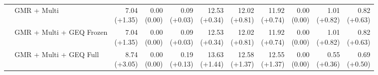 \documentclass{article}
\begin{document}
{\begin{tabular}{llrrrrrrrrr}
 & GMR + Multi & \shortstack{7.04 \\ {\scriptsize\textcolor{Gain}{(+1.35)}}} & \shortstack{0.00 \\ {\scriptsize\textcolor{Zero}{(0.00)}}} & \shortstack{0.09 \\ {\scriptsize\textcolor{Gain}{(+0.03)}}} & \shortstack{12.53 \\ {\scriptsize\textcolor{Gain}{(+0.34)}}} & \shortstack{12.02 \\ {\scriptsize\textcolor{Gain}{(+0.81)}}} & \shortstack{11.92 \\ {\scriptsize\textcolor{Gain}{(+0.74)}}} & \shortstack{0.00 \\ {\scriptsize\textcolor{Zero}{(0.00)}}} & \shortstack{1.01 \\ {\scriptsize\textcolor{Gain}{(+0.82)}}} & \shortstack{0.82 \\ {\scriptsize\textcolor{Gain}{(+0.63)}}} \\
 & GMR + Multi + GEQ Frozen & \shortstack{7.04 \\ {\scriptsize\textcolor{Gain}{(+1.35)}}} & \shortstack{0.00 \\ {\scriptsize\textcolor{Zero}{(0.00)}}} & \shortstack{0.09 \\ {\scriptsize\textcolor{Gain}{(+0.03)}}} & \shortstack{12.53 \\ {\scriptsize\textcolor{Gain}{(+0.34)}}} & \shortstack{12.02 \\ {\scriptsize\textcolor{Gain}{(+0.81)}}} & \shortstack{11.92 \\ {\scriptsize\textcolor{Gain}{(+0.74)}}} & \shortstack{0.00 \\ {\scriptsize\textcolor{Zero}{(0.00)}}} & \shortstack{1.01 \\ {\scriptsize\textcolor{Gain}{(+0.82)}}} & \shortstack{0.82 \\ {\scriptsize\textcolor{Gain}{(+0.63)}}} \\
 & GMR + Multi + GEQ Full & \shortstack{8.74 \\ {\scriptsize\textcolor{Gain}{(+3.05)}}} & \shortstack{0.00 \\ {\scriptsize\textcolor{Zero}{(0.00)}}} & \shortstack{0.19 \\ {\scriptsize\textcolor{Gain}{(+0.13)}}} & \shortstack{13.63 \\ {\scriptsize\textcolor{Gain}{(+1.44)}}} & \shortstack{12.58 \\ {\scriptsize\textcolor{Gain}{(+1.37)}}} & \shortstack{12.55 \\ {\scriptsize\textcolor{Gain}{(+1.37)}}} & \shortstack{0.00 \\ {\scriptsize\textcolor{Zero}{(0.00)}}} & \shortstack{0.55 \\ {\scriptsize\textcolor{Gain}{(+0.36)}}} & \shortstack{0.69 \\ {\scriptsize\textcolor{Gain}{(+0.50)}}} \\

\end{tabular}}
\end{document}
